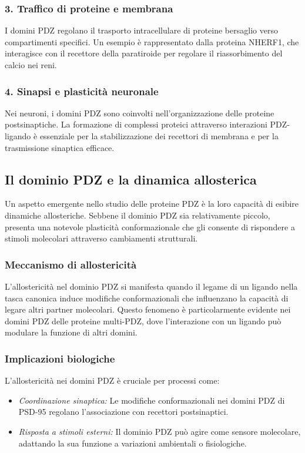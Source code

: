 \documentclass[Lau,binding=0.6cm,oneside,noexaminfo]{sapthesis}
\begin{document}
\subsubsection*{3. Traffico di proteine e membrana}
I domini PDZ regolano il trasporto intracellulare di proteine bersaglio verso compartimenti specifici. Un esempio è rappresentato dalla proteina NHERF1, che interagisce con il recettore della paratiroide per regolare il riassorbimento del calcio nei reni.

\subsubsection*{4. Sinapsi e plasticità neuronale}
Nei neuroni, i domini PDZ sono coinvolti nell’organizzazione delle proteine postsinaptiche. La formazione di complessi proteici attraverso interazioni PDZ-ligando è essenziale per la stabilizzazione dei recettori di membrana e per la trasmissione sinaptica efficace.

\subsection*{Il dominio PDZ e la dinamica allosterica}

Un aspetto emergente nello studio delle proteine PDZ è la loro capacità di esibire dinamiche allosteriche. Sebbene il dominio PDZ sia relativamente piccolo, presenta una notevole plasticità conformazionale che gli consente di rispondere a stimoli molecolari attraverso cambiamenti strutturali.

\subsubsection*{Meccanismo di allostericità}
L’allostericità nel dominio PDZ si manifesta quando il legame di un ligando nella tasca canonica induce modifiche conformazionali che influenzano la capacità di legare altri partner molecolari. Questo fenomeno è particolarmente evidente nei domini PDZ delle proteine multi-PDZ, dove l’interazione con un ligando può modulare la funzione di altri domini.

\subsubsection*{Implicazioni biologiche}
L’allostericità nei domini PDZ è cruciale per processi come:
\begin{itemize}
    \item \emph{Coordinazione sinaptica:} Le modifiche conformazionali nei domini PDZ di PSD-95 regolano l’associazione con recettori postsinaptici.
    \item \emph{Risposta a stimoli esterni:} Il dominio PDZ può agire come sensore molecolare, adattando la sua funzione a variazioni ambientali o fisiologiche.
\end{itemize}
\end{document}
